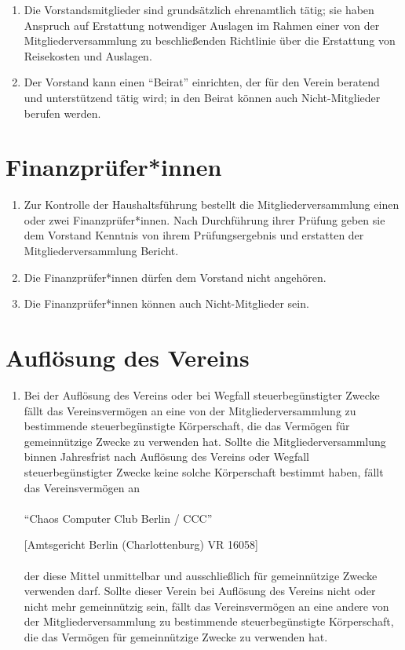 \documentclass[a4paper]{article}
\begin{document}
\begin{enumerate}
	\item Die Vorstandsmitglieder sind grundsätzlich ehrenamtlich tätig; sie haben Anspruch auf Erstattung notwendiger Auslagen im Rahmen einer von der Mitgliederversammlung zu beschließenden Richtlinie über die Erstattung von Reisekosten und Auslagen. 
	
	\item Der Vorstand kann einen \enquote{Beirat} einrichten, der für den Verein beratend und unterstützend tätig wird; in den Beirat können auch Nicht-Mitglieder berufen werden. 

\end{enumerate}

\section{Finanzprüfer*innen}
\begin{enumerate}
	\item Zur Kontrolle der Haushaltsführung bestellt die Mitgliederversammlung einen oder zwei Finanzprüfer*innen. Nach Durchführung ihrer Prüfung geben sie dem Vorstand Kenntnis von ihrem Prüfungsergebnis und erstatten der Mitgliederversammlung Bericht.
	\item Die Finanzprüfer*innen dürfen dem Vorstand nicht angehören. 
	\item Die Finanzprüfer*innen können auch Nicht-Mitglieder sein.
\end{enumerate}

\filbreak
\section{Auflösung des Vereins}
\begin{enumerate}
	\item Bei der Auflösung des Vereins oder bei Wegfall steuerbegünstigter Zwecke fällt das Vereinsvermögen an eine von der Mitgliederversammlung zu bestimmende steuerbegünstigte Körperschaft, die das Vermögen für gemeinnützige Zwecke zu verwenden hat. Sollte die Mitgliederversammlung binnen Jahresfrist nach Auflösung des Vereins oder Wegfall steuerbegünstigter Zwecke keine solche Körperschaft bestimmt haben, fällt das Vereinsvermögen an
	 \\
	 \\
	\enquote{Chaos Computer Club Berlin / CCC}
	
	[Amtsgericht Berlin (Charlottenburg) VR 16058]
	\\
	\\
	der diese Mittel unmittelbar und ausschließlich für gemeinnützige Zwecke verwenden darf. Sollte dieser Verein bei Auflösung des Vereins nicht oder nicht mehr gemeinnützig sein, fällt das Vereinsvermögen an eine andere von der Mitgliederversammlung zu bestimmende steuerbegünstigte Körperschaft, die das Vermögen für gemeinnützige Zwecke zu verwenden hat.
\end{enumerate}
\end{document}
